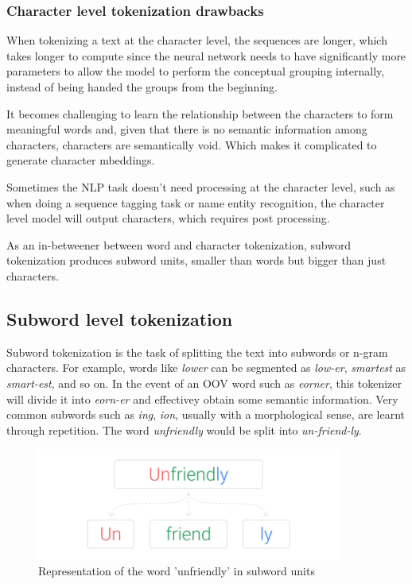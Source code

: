 \subsubsection{Character level tokenization drawbacks}

When tokenizing a text at the character level, the sequences are longer, which takes longer to compute since the neural network needs to have significantly more parameters to allow the model to perform the conceptual grouping internally, instead of being handed the groups from the beginning.

It becomes challenging to learn the relationship between the characters to form meaningful words and, given that there is no semantic information among characters, characters are semantically void. Which makes it complicated to generate character mbeddings.

Sometimes the NLP task doesn't need processing at the character level, such as when doing a sequence tagging task or name entity recognition, the character level model will output characters, which requires post processing.

As an in-betweener between word and character tokenization, subword tokenization produces subword units, smaller than words but bigger than just characters.

\subsection{Subword level tokenization}

Subword tokenization is the task of splitting the text into subwords or n-gram characters. For example, words like \emph{lower} can be segmented as \emph{low-er}, \emph{smartest} as \emph{smart-est}, and so on. In the event of an OOV word such as \emph{eorner}, this tokenizer will divide it into \emph{eorn-er} and effectivey obtain some semantic information. Very common subwords such as \emph{ing}, \emph{ion}, usually with a morphological sense, are learnt through repetition. The word \emph{unfriendly} would be split into \emph{un-friend-ly}.

\begin{figure}[!ht]
    \centering
    \includegraphics[width=10cm]{figures/subword.png}
    \caption{Representation of the word 'unfriendly' in subword units}
\end{figure}

